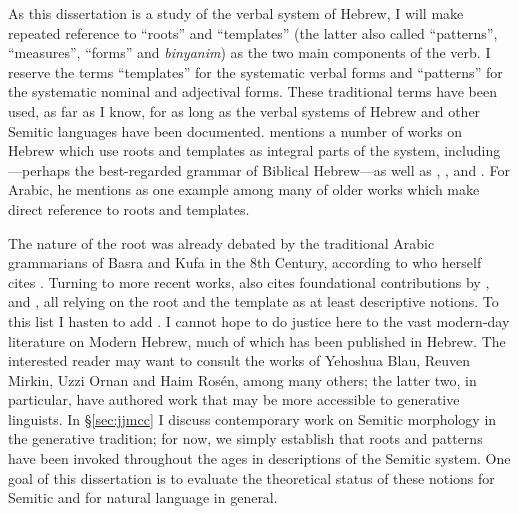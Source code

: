As this dissertation is a study of the verbal system of Hebrew, I will make repeated reference to ``roots'' and ``templates'' (the latter also called ``patterns'', ``measures'', ``forms'' and \emph{binyanim}) as the two main components of the verb. I reserve the terms ``templates'' for the systematic verbal forms and ``patterns'' for the systematic nominal and adjectival forms. These traditional terms have been used, as far as I know, for as long as the verbal systems of Hebrew and other Semitic languages have been documented. \cite{ussishkin00phd} mentions a number of works on Hebrew which use roots and templates as integral parts of the system, including \cite{gesenius}---perhaps the best-regarded grammar of Biblical Hebrew---as well as \cite{bopp1824}, \cite{ewald1827}, \cite{harris41} and \cite{chomsky51}. For Arabic, he mentions \cite{desacy1810} as one example among many of older works which make direct reference to roots and templates.

The nature of the root was already debated by the traditional Arabic grammarians of Basra and Kufa in the 8th Century, according to \citet[563ff]{borer13oup} who herself cites \cite{owens88}. Turning to more recent works, \cite{borer13oup} also cites foundational contributions by \cite{berman78}, \cite{bolozky78,bolozky99} and \cite{ravid90}, all relying on the root and the template as at least descriptive notions. To this list I hasten to add \cite{rosen77}. I cannot hope to do justice here to the vast modern-day literature on Modern Hebrew, much of which has been published in Hebrew. The interested reader may want to consult the works of Yehoshua Blau, Reuven Mirkin, Uzzi Ornan and Haim Ros\'en, among many others; the latter two, in particular, have authored work that may be more accessible to generative linguists. In \S\ref{sec:jjmcc} I discuss contemporary work on Semitic morphology in the generative tradition; for now, we simply establish that roots and patterns have been invoked throughout the ages in descriptions of the Semitic system. One goal of this dissertation is to evaluate the theoretical status of these notions for Semitic and for natural language in general.

